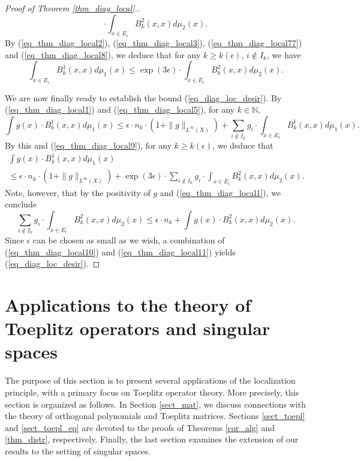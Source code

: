 \documentclass[12pt]{article}
\numberwithin{equation}{section}
\theoremstyle{theorem}
\theoremstyle{definition}
\theoremstyle{remark}
\newcommand{\nat}{\mathbb{N}}
\begin{document}
\begin{proof}[Proof of Theorem \ref{thm_diag_local}.]
\begin{equation}
			\cdot
			\int_{x \in E_i} B^2_k(x, x)  d \mu_2(x).
		\end{equation}
		By (\ref{eq_thm_diag_local2}), (\ref{eq_thm_diag_local3}), (\ref{eq_thm_diag_local77}) and (\ref{eq_thm_diag_local8}), we deduce that for any $k \geq k(\epsilon)$, $i \notin I_k$, we have
		\begin{equation}\label{eq_thm_diag_local9}
			\int_{x \in E_i} B^1_k(x, x)  d \mu_1(x) \leq \exp(3 \epsilon) \cdot \int_{x \in E_i} B^2_k(x, x)  d \mu_2(x).
		\end{equation}
		\par 
		We are now finally ready to establish the bound (\ref{eq_diag_loc_desir}).
		By (\ref{eq_thm_diag_local1}) and (\ref{eq_thm_diag_local5}), for any $k \in \nat$,
		\begin{equation}
			\int g(x) \cdot B^1_k(x, x)  d \mu_1(x)
			\leq
			\epsilon \cdot n_k \cdot (1 + \| g \|_{L^{\infty}(X)})
			+
			\sum_{i \notin I_k}
			g_i \cdot
			\int_{x \in E_i} B^1_k(x, x)  d \mu_1(x).
		\end{equation}
		By this and (\ref{eq_thm_diag_local9}), for any $k \geq k(\epsilon)$, we deduce that 
		\begin{multline}\label{eq_thm_diag_local10}
			\int g(x) \cdot B^1_k(x, x)  d \mu_1(x)
			\\
			\leq
			\epsilon \cdot n_k \cdot (1 + \| g \|_{L^{\infty}(X)})
			+
			\exp(3 \epsilon)
			\cdot
			\sum_{i \notin I_k}
			g_i \cdot
			\int_{x \in E_i} B^2_k(x, x)  d \mu_2(x).
		\end{multline}
		Note, however, that by the positivity of $g$ and (\ref{eq_thm_diag_local1}), we conclude
		\begin{equation}\label{eq_thm_diag_local11}
			\sum_{i \notin I_k}
			g_i \cdot
			\int_{x \in E_i} B^2_k(x, x)  d \mu_2(x)
			\leq
			\epsilon \cdot n_k
			+
			\int g(x) \cdot B^2_k(x, x)  d \mu_2(x).
		\end{equation}
		Since $\epsilon$ can be chosen as small as we wish, a combination of (\ref{eq_thm_diag_local10}) and (\ref{eq_thm_diag_local11}) yields  (\ref{eq_diag_loc_desir}).
	\end{proof}
	

	\section{Applications to the theory of Toeplitz operators and singular spaces}\label{sect_appl}
	The purpose of this section is to present several applications of the localization principle, with a primary focus on Toeplitz operator theory.
	More precisely, this section is organized as follows.
	In Section \ref{sect_mat}, we discuss connections with the theory of orthogonal polynomials and Toeplitz matrices.
Sections \ref{sect_toepl} and \ref{sect_toepl_eq} are devoted to the proofs of Theorems \ref{cor_alg} and \ref{thm_distr}, respectively.
Finally, the last section examines the extension of our results to the setting of singular spaces.
\end{document}
